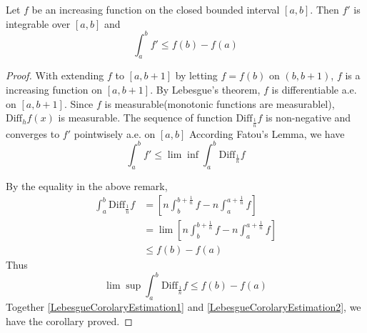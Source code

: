 \documentclass[lang=en, 12pt]{elegantbook}
\begin{document}
        \begin{corollary}\label{IncreasingFunctionFTCLikeInequality}
            Let $f$ be an increasing function on the closed bounded interval $[a,b]$. Then $f'$ is integrable over $[a,b]$ and 
        \begin{equation}
            \int_{a}^{b} f' \leq f(b) - f(a)
        \end{equation}
        \end{corollary}
        \begin{proof}
            With extending $f$ to $[a,b+1]$ by letting $f=f(b)$ on $(b,b+1)$, $f$ is a increasing function on $[a,b+1]$. By Lebesgue's
        theorem, $f$ is differentiable a.e. on $[a, b+1]$. Since $f$ is measurable(monotonic functions are measurablel), $\mbox{Diff}_h f(x)$
        is measurable. The sequence of function $\mbox{Diff}_{\frac{1}{n}}f$ is non-negative and converges to $f'$ pointwisely a.e. on $[a,b]$
        According Fatou's Lemma, we have 
        \begin{equation}\label{LebesgueCorolaryEstimation1} 
            \int_a^b f' \leq \lim \inf \int_a^b \mbox{Diff}_{\frac{1}{n}}f    
        \end{equation}
        
        By the equality in the above remark,
        \begin{equation*}
            \begin{aligned}
                \int_a^b \mbox{Diff}_{\frac{1}{n}}f &= \left[n \int_b^{b+\frac{1}{n}} f - n \int_a^{a+\frac{1}{n}} f \right]\\
                &=\lim \left[n \int_b^{b+\frac{1}{n}} f - n \int_a^{a+\frac{1}{n}} f \right]\\
                &\leq  f(b) - f(a)  
            \end{aligned}
        \end{equation*}
        Thus 
        \begin{equation}\label{LebesgueCorolaryEstimation2}
            \lim \sup \int_a^b \mbox{Diff}_{\frac{1}{n}}f \leq f(b) -f(a)
        \end{equation}
        Together \eqref{LebesgueCorolaryEstimation1} and \eqref{LebesgueCorolaryEstimation2}, we have the corollary proved.
        \end{proof}
\end{document}
